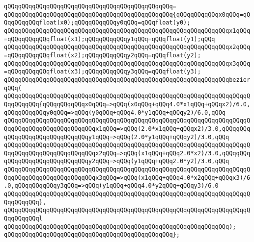 \verb|qQQqqQQqqQQqqQQqqQQqqQQqqQQqqQQqqQQqqQQqqQQqqQQq=|\newline
\verb|qQQqqQQqqQQqqQQqqQQqqQQqqQQqqQQqqQQqqQQqqQQqqQQq{qQQqqQQqqQQqx0qQQq=qQQqqQQqqQQqfloat(x0);qQQqqQQqqQQqy0qQQq=qQQqfloat(y0);|\newline
\verb|qQQqqQQqqQQqqQQqqQQqqQQqqQQqqQQqqQQqqQQqqQQqqQQqqQQqqQQqqQQqqQQqx1qQQq=qQQqqQQqqQQqfloat(x1);qQQqqQQqqQQqy1qQQq=qQQqfloat(y1);qQQq|\newline
\verb|qQQqqQQqqQQqqQQqqQQqqQQqqQQqqQQqqQQqqQQqqQQqqQQqqQQqqQQqqQQqqQQqx2qQQq=qQQqqQQqqQQqfloat(x2);qQQqqQQqqQQqy2qQQq=qQQqfloat(y2);|\newline
\verb|qQQqqQQqqQQqqQQqqQQqqQQqqQQqqQQqqQQqqQQqqQQqqQQqqQQqqQQqqQQqqQQqx3qQQq=qQQqqQQqqQQqfloat(x3);qQQqqQQqqQQqy3qQQq=qQQqfloat(y3);|\newline
\newline
\verb|qQQqqQQqqQQqqQQqqQQqqQQqqQQqqQQqqQQqqQQqqQQqqQQqqQQqqQQqqQQqqQQqbezierqQQq(|\newline
\verb|qQQqqQQqqQQqqQQqqQQqqQQqqQQqqQQqqQQqqQQqqQQqqQQqqQQqqQQqqQQqqQQqqQQqqQQqqQQqqQQq{qQQqqQQqqQQqx0qQQq=>qQQq(x0qQQq+qQQq4.0*x1qQQq+qQQqx2)/6.0,qQQqqQQqqQQqy0qQQq=>qQQq(y0qQQq+qQQq4.0*y1qQQq+qQQqy2)/6.0,qQQq|\newline
\verb|qQQqqQQqqQQqqQQqqQQqqQQqqQQqqQQqqQQqqQQqqQQqqQQqqQQqqQQqqQQqqQQqqQQqqQQqqQQqqQQqqQQqqQQqqQQqqQQqx1qQQq=>qQQq(2.0*x1qQQq+qQQqx2)/3.0,qQQqqQQqqQQqqQQqqQQqqQQqqQQqqQQqy1qQQq=>qQQq(2.0*y1qQQq+qQQqy2)/3.0,qQQq|\newline
\verb|qQQqqQQqqQQqqQQqqQQqqQQqqQQqqQQqqQQqqQQqqQQqqQQqqQQqqQQqqQQqqQQqqQQqqQQqqQQqqQQqqQQqqQQqqQQqqQQqx2qQQq=>qQQq(x1qQQq+qQQq2.0*x2)/3.0,qQQqqQQqqQQqqQQqqQQqqQQqqQQqqQQqy2qQQq=>qQQq(y1qQQq+qQQq2.0*y2)/3.0,qQQq|\newline
\verb|qQQqqQQqqQQqqQQqqQQqqQQqqQQqqQQqqQQqqQQqqQQqqQQqqQQqqQQqqQQqqQQqqQQqqQQqqQQqqQQqqQQqqQQqqQQqqQQqx3qQQq=>qQQq(x1qQQq+qQQq4.0*x2qQQq+qQQqx3)/6.0,qQQqqQQqqQQqy3qQQq=>qQQq(y1qQQq+qQQq4.0*y2qQQq+qQQqy3)/6.0|\newline
\verb|qQQqqQQqqQQqqQQqqQQqqQQqqQQqqQQqqQQqqQQqqQQqqQQqqQQqqQQqqQQqqQQqqQQqqQQqqQQqqQQq},|\newline
\verb|qQQqqQQqqQQqqQQqqQQqqQQqqQQqqQQqqQQqqQQqqQQqqQQqqQQqqQQqqQQqqQQqqQQqqQQqqQQqqQQql|\newline
\verb|qQQqqQQqqQQqqQQqqQQqqQQqqQQqqQQqqQQqqQQqqQQqqQQqqQQqqQQqqQQqqQQq);|\newline
\verb|qQQqqQQqqQQqqQQqqQQqqQQqqQQqqQQqqQQqqQQqqQQqqQQq};|\newline
\newline
